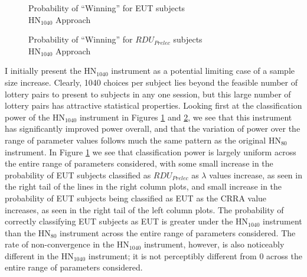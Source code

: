\documentclass[../main.tex]{subfiles}
\begin{document}
\begin{figure}[h!]
	\center
	\caption{Probability of \enquote{Winning} for EUT subjects\\$\text{HN}_{1040}$ Approach}
	\label{fig:HN_win_eut}
\end{figure}

\begin{figure}[h!]
	\center
	\caption{Probability of \enquote{Winning} for $\mathit{RDU_{Prelec}}$ subjects\\$\text{HN}_{1040}$ Approach}
	\label{fig:HN_win_pre}
\end{figure}

I initially present the $\text{HN}_{1040}$ instrument as a potential limiting case of a sample size increase.
Clearly, 1040 choices per subject lies beyond the feasible number of lottery pairs to present to subjects in any one session, but this large number of lottery pairs has attractive statistical properties.
Looking first at the classification power of the $\text{HN}_{1040}$ instrument in Figures \ref{fig:HN_win_eut} and \ref{fig:HN_win_pre}, we see that this instrument has significantly improved power overall, and that the variation of power over the range of parameter values follows much the same pattern as the original $\text{HN}_{80}$ instrument.
In Figure \ref{fig:HN_win_eut} we see that classification power is largely uniform across the entire range of parameters considered, with some small increase in the probability of EUT subjects classified as $\mathit{RDU_{Prelec}}$ as $\lambda$ values increase, as seen in the right tail of the lines in the right column plots, and small increase in the probability of EUT subjects being classified as EUT as the CRRA value increases, as seen in the right tail of the left column plots.
The probability of correctly classifying EUT subjects as EUT is greater under the $\text{HN}_{1040}$ instrument than the $\text{HN}_{80}$ instrument across the entire range of parameters considered.
The rate of non-convergence in the $\text{HN}_{1040}$ instrument, however, is also noticeably different in the $\text{HN}_{1040}$ instrument; it is not perceptibly different from 0 across the entire range of parameters considered.
\end{document}
